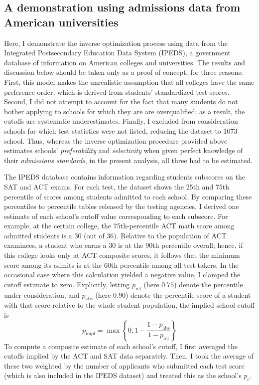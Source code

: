\documentclass[12pt]{article}
\numberwithin{equation}{subsection}
\theoremstyle{definition}
\begin{document}
\subsection{A demonstration using admissions data from American universities}
Here, I demonstrate the inverse optimization process using data from the Integrated Postsecondary Education Data System (IPEDS), a government database of information on American colleges and universities. The results and discussion below should be taken only as a proof of concept, for three reasons: First, this model makes the unrealistic assumption that all colleges have the same preference order, which is derived from students' standardized test scores. Second, I did not attempt to account for the fact that many students do not bother applying to schools for which they are are overqualified; as a result, the cutoffs are systematic underestimates. Finally, I excluded from consideration schools for which test statistics were not listed, reducing the dataset to 1073 school. Thus, whereas the inverse optimization procedure provided above estimates schools' \emph{preferability} and \emph{selectivity} when given perfect knowledge of their \emph{admissions standards}, in the present analysis, all three had to be estimated.

The IPEDS database contains information regarding students subscores on the SAT and ACT exams. For each test, the dataset shows the 25th and 75th percentile of scores among students admitted to each school. By comparing these percentiles to percentile tables released by the testing agencies, I derived one estimate of each school's cutoff value corresponding to each subscore. For example, at the certain college, the 75th-percentile ACT math score among admitted students is a 30 (out of 36). Relative to the population of ACT examinees, a student who earns a 30 is at the 90th percentile overall; hence, if this college looks only at ACT composite scores, it follows that the minimum score among its admits is at the 60th percentile among all test-takers. In the occasional case where this calculation yielded a negative value, I clamped the cutoff estimate to zero. Explicitly, letting $p_{\text{rel}}$ (here $0.75$) denote the percentile under consideration, and $p_{\text{abs}}$ (here $0.90$) denote the percentile score of a student with that score relative to the whole student population, the implied school cutoff is
\[p_{\text{impl}} = \max\left\{0, 1 - \frac{1 - p_{\text{abs}}}{1- p_{\text{rel}}}\right\}\]
To compute a composite estimate of each school's cutoff, I first averaged the cutoffs implied by the ACT and SAT data separately. Then, I took the average of these two weighted by the number of applicants who submitted each test score (which is also included in the IPEDS dataset) and treated this as the school's $p_c$.
\end{document}
